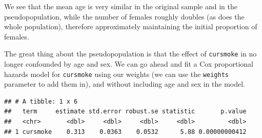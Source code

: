 \documentclass[
]{book}
\newenvironment{Shaded}{\begin{snugshade}}{\end{snugshade}}
\newcommand{\CommentTok}[1]{\textcolor[rgb]{0.56,0.35,0.01}{\textit{#1}}}
\newcommand{\DataTypeTok}[1]{\textcolor[rgb]{0.13,0.29,0.53}{#1}}
\newcommand{\FloatTok}[1]{\textcolor[rgb]{0.00,0.00,0.81}{#1}}
\newcommand{\KeywordTok}[1]{\textcolor[rgb]{0.13,0.29,0.53}{\textbf{#1}}}
\newcommand{\NormalTok}[1]{#1}
\newcommand{\OperatorTok}[1]{\textcolor[rgb]{0.81,0.36,0.00}{\textbf{#1}}}
\newcommand{\StringTok}[1]{\textcolor[rgb]{0.31,0.60,0.02}{#1}}
\begin{document}
We see that the mean age is very similar in the original sample and in the pseudopopulation, while the number of females roughly doubles (as does the whole population), therefore approximately maintaining the initial proportion of females.

The great thing about the pseudopopulation is that the effect of \texttt{cursmoke} in no longer confounded by age and sex.
We can go ahead and fit a Cox proportional hazards model for \texttt{cursmoke} using our weights (we can use the \texttt{weights} parameter to add them in), and without including age and sex in the model.

\begin{Shaded}
\end{Shaded}

\begin{verbatim}
## # A tibble: 1 x 6
##   term     estimate std.error robust.se statistic       p.value
##   <chr>       <dbl>     <dbl>     <dbl>     <dbl>         <dbl>
## 1 cursmoke    0.313    0.0363    0.0532      5.88 0.00000000412
\end{verbatim}

\begin{Shaded}
\end{Shaded}
\end{document}

